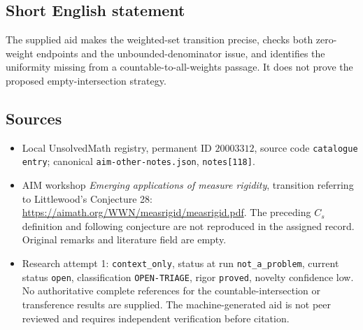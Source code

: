 \documentclass[11pt]{article}
\begin{document}
\subsection{Short English statement}
The supplied aid makes the weighted-set transition precise, checks both zero-weight endpoints and the unbounded-denominator issue, and identifies the uniformity missing from a countable-to-all-weights passage. It does not prove the proposed empty-intersection strategy.
\subsection{Sources}
\begin{itemize}
\item Local UnsolvedMath registry, permanent ID $20003312$, source code \texttt{catalogue entry}; canonical \texttt{aim-other-notes.json}, \texttt{notes[118]}.
\item AIM workshop \emph{Emerging applications of measure rigidity}, transition referring to Littlewood's Conjecture 28: \url{https://aimath.org/WWN/measrigid/measrigid.pdf}. The preceding $C_s$ definition and following conjecture are not reproduced in the assigned record. Original remarks and literature field are empty.
\item Research attempt 1: \texttt{context\_only}, status at run \texttt{not\_a\_problem}, current status \texttt{open}, classification \texttt{OPEN-TRIAGE}, rigor \texttt{proved}, novelty confidence low. No authoritative complete references for the countable-intersection or transference results are supplied. The machine-generated aid is not peer reviewed and requires independent verification before citation.
\end{itemize}
\end{document}
